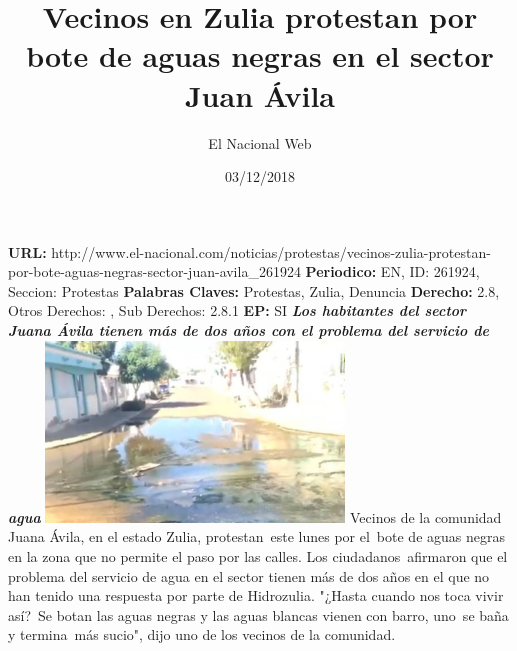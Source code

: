 \documentclass{article}%
\title{\textbf{Vecinos en Zulia protestan por bote de aguas negras en el sector Juan Ávila}}%
\author{El Nacional Web}%
\date{03/12/2018}%
\begin{document}
%
\normalsize%
\maketitle%
\textbf{URL: }%
http://www.el{-}nacional.com/noticias/protestas/vecinos{-}zulia{-}protestan{-}por{-}bote{-}aguas{-}negras{-}sector{-}juan{-}avila\_261924\newline%
%
\textbf{Periodico: }%
EN, %
ID: %
261924, %
Seccion: %
Protestas\newline%
%
\textbf{Palabras Claves: }%
Protestas, Zulia, Denuncia\newline%
%
\textbf{Derecho: }%
2.8, %
Otros Derechos: %
, %
Sub Derechos: %
2.8.1\newline%
%
\textbf{EP: }%
SI\newline%
\newline%
%
\textbf{\textit{Los habitantes del sector Juana Ávila tienen más de dos años con el problema del servicio de agua}}%
\newline%
\newline%
%
\includegraphics[width=300px]{50.jpg}%
\newline%
%
Vecinos de la comunidad Juana Ávila, en el estado Zulia, protestan~este lunes por el~bote de aguas negras en la zona que no permite el paso por las calles.%
\newline%
%
Los ciudadanos~afirmaron que el problema del servicio de agua en el sector tienen más de dos años en el que no han tenido una respuesta por parte de Hidrozulia.%
\newline%
%
"¿Hasta cuando nos toca vivir así?~Se botan las aguas negras y las aguas blancas vienen con barro, uno~se baña y termina~más sucio", dijo uno de los vecinos de la comunidad.%
\newline%
%
\end{document}
